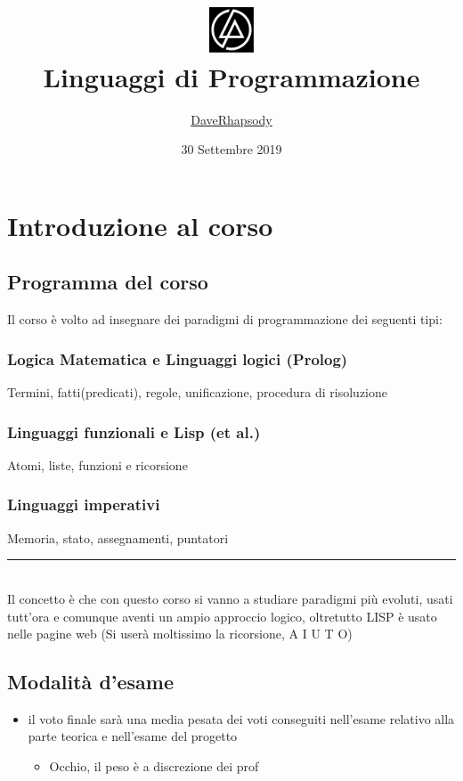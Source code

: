 \documentclass[12pt, a4paper, openany, oneside]{book}
\begin{document}
\selectfont
\author{\href{https://github.com/daverhapsody}{DaveRhapsody}}
\title{\includegraphics[width=0.10\textwidth]{logo}\\ 
Linguaggi di Programmazione}
\color{blue}
\date{30 Settembre 2019}
\color{black}
\maketitle
\tableofcontents
\chapter{Introduzione al corso}
\section{Programma del corso}
Il corso è volto ad insegnare dei paradigmi di programmazione dei seguenti tipi:
\subsection{Logica Matematica e Linguaggi logici (Prolog)}
Termini, fatti(predicati), regole, unificazione, procedura di risoluzione
\subsection{Linguaggi funzionali e Lisp (et al.)}
Atomi, liste, funzioni e ricorsione
\subsection{Linguaggi imperativi}
\label{sub:linguaggi_imperativi}
Memoria, stato, assegnamenti, puntatori
\\ 
{\color{black} \rule{\linewidth}{0.3mm} }
\\
Il concetto è che con questo corso si vanno a studiare paradigmi più evoluti,
usati tutt'ora e comunque aventi un ampio approccio logico, oltretutto LISP è 
usato nelle pagine web (Si userà moltissimo la ricorsione, A I U T O)
\section{Modalità d'esame}
\label{sec:modalità_d_esame}
\begin{itemize}
	\item il voto finale sarà una media pesata dei voti conseguiti nell'esame 
	relativo alla parte teorica e nell'esame del progetto 
	\begin{itemize}
		\item Occhio, il peso è a discrezione dei prof
	\end{itemize}
\end{itemize}
\end{document}
